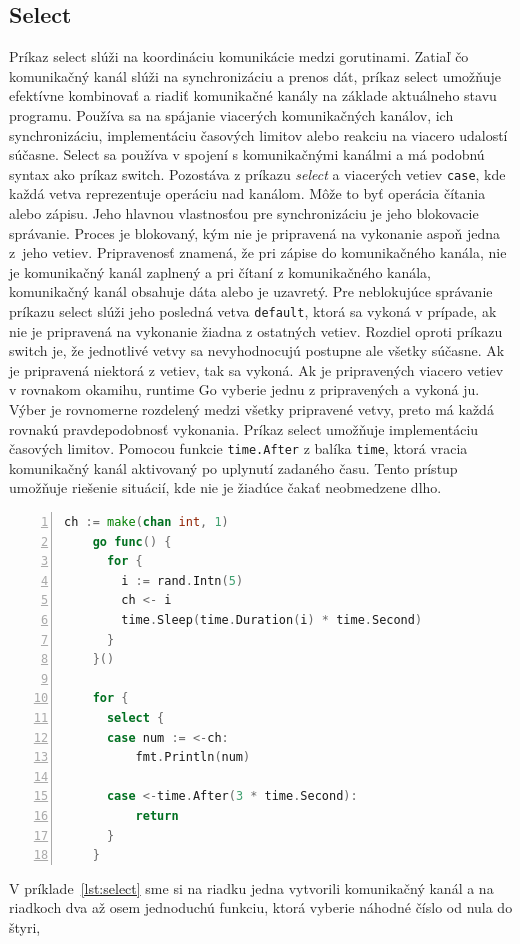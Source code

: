 \documentclass[
  biblatex,
  seconds=true,
  language=slovak,
  figures=false,
  urldate=iso,
  glossaries,
  index
]{kidiplom}
\begin{document}
\subsection{Select}
Príkaz select slúži na koordináciu komunikácie medzi gorutinami. Zatiaľ čo komunikačný kanál slúži na synchronizáciu a prenos dát,
príkaz select umožňuje efektívne kombinovať a riadiť komunikačné kanály na základe aktuálneho stavu programu.
Používa sa na spájanie viacerých komunikačných kanálov, ich synchronizáciu, implementáciu časových limitov alebo reakciu na
viacero udalostí súčasne. Select sa používa v spojení s komunikačnými kanálmi a má podobnú syntax ako príkaz switch. \cite{cox2017}
Pozostáva z príkazu \emph{select} a viacerých vetiev \texttt{case}, kde každá vetva
reprezentuje operáciu nad kanálom. Môže to byť operácia čítania alebo zápisu. Jeho hlavnou vlastnosťou pre synchronizáciu
je jeho blokovacie správanie. Proces je blokovaný, kým nie je pripravená na vykonanie aspoň jedna z~jeho vetiev.
Pripravenosť znamená, že pri zápise do komunikačného kanála, nie je komunikačný kanál zaplnený a pri čítaní z komunikačného kanála, komunikačný kanál obsahuje dáta alebo je uzavretý. Pre neblokujúce správanie
príkazu select slúži jeho posledná vetva \texttt{default}, ktorá sa vykoná v prípade, ak nie je pripravená na vykonanie
žiadna z ostatných vetiev. \cite{select}
Rozdiel oproti príkazu switch je, že jednotlivé vetvy sa nevyhodnocujú postupne ale všetky súčasne.
Ak je pripravená niektorá z vetiev, tak sa vykoná. Ak je pripravených viacero vetiev v rovnakom okamihu, runtime Go vyberie
jednu z pripravených a vykoná ju. Výber je rovnomerne rozdelený medzi všetky pripravené vetvy, preto má každá rovnakú
pravdepodobnosť vykonania\cite{cox2017}. Príkaz select umožňuje implementáciu časových limitov. Pomocou funkcie \texttt{time.After}
z balíka \texttt{time}, ktorá vracia komunikačný kanál aktivovaný po uplynutí zadaného času. \cite{time} Tento prístup umožňuje riešenie situácií,
kde nie je žiadúce čakať neobmedzene dlho.
\begin{lstlisting}[language=Go, numbers=left, caption={Príklad použitia príkazu select},captionpos=b, label={lst:select}]
	ch := make(chan int, 1)
	go func() {
	  for {
	  	i := rand.Intn(5)
		ch <- i
		time.Sleep(time.Duration(i) * time.Second)
	  }
	}()

	for {
	  select {
	  case num := <-ch:
		  fmt.Println(num)

	  case <-time.After(3 * time.Second):
		  return
	  }
	}
\end{lstlisting}
V príklade~\ref{lst:select} sme si na riadku jedna vytvorili komunikačný kanál a na riadkoch dva až osem jednoduchú funkciu, ktorá vyberie náhodné číslo od nula do štyri,
\end{document}
